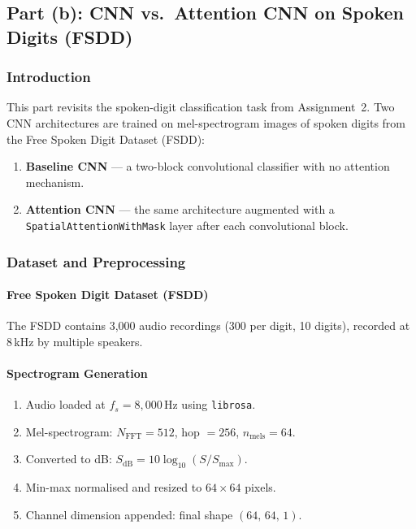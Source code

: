 \newpage
\subsection{Part (b): CNN vs.\ Attention CNN on Spoken Digits (FSDD)}

\subsubsection{Introduction}

This part revisits the spoken-digit classification task from Assignment~2. Two CNN
architectures are trained on mel-spectrogram images of spoken digits from the Free
Spoken Digit Dataset (FSDD):

\begin{enumerate}[leftmargin=1.5em]
    \item \textbf{Baseline CNN} --- a two-block convolutional classifier with no
	    attention mechanism.
    \item \textbf{Attention CNN} --- the same architecture augmented with a
	    \texttt{SpatialAttentionWithMask} layer after each convolutional block.
\end{enumerate}

\subsubsection{Dataset and Preprocessing}

\paragraph{Free Spoken Digit Dataset (FSDD)}

The FSDD contains 3,000 audio recordings (300 per digit, 10 digits), recorded at
8\,kHz by multiple speakers.

\paragraph{Spectrogram Generation}

\begin{enumerate}[leftmargin=1.5em]
    \item Audio loaded at $f_s = 8{,}000$\,Hz using \texttt{librosa}.
    \item Mel-spectrogram: $N_\text{FFT}=512$, hop $= 256$, $n_\text{mels} = 64$.
    \item Converted to dB: $S_\text{dB} = 10\log_{10}(S/S_\text{max})$.
    \item Min-max normalised and resized to $64\times64$ pixels.
    \item Channel dimension appended: final shape $(64,\,64,\,1)$.
\end{enumerate}

